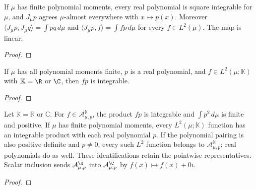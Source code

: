 \begin{supporting}

\begin{theorem}
\label{thm:general-polynomial-L2-basic}
\leanok
If $\mu$ has finite polynomial moments, every real polynomial is square
integrable for $\mu$, and $J_\mu p$ agrees $\mu$-almost everywhere with
$x\mapsto p(x)$. Moreover $\langle J_\mu p,J_\mu q\rangle=\int pq\,d\mu$ and
$\langle J_\mu p,f\rangle=\int fp\,d\mu$ for every $f\in L^2(\mu)$.
The map is linear.
\end{theorem}
\begin{proof}
\leanok
\end{proof}

\begin{theorem}
\label{thm:L2-polynomial-product-integrable}
\leanok
If $\mu$ has all polynomial moments finite, $p$ is a real polynomial, and
$f\in L^2(\mu;\mathbb K)$ with $\mathbb K=\R$ or $\C$, then $fp$ is integrable.
\end{theorem}
\begin{proof}
\leanok
\end{proof}

\begin{theorem}
\label{thm:integral-coefficient-input}
\leanok
Let $\mathbb K=\mathbb R$ or $\mathbb C$.
For $f\in\mathcal A_{\mu,p}^{\mathbb K}$, the product $fp$ is integrable
and $\int p^2\,d\mu$ is finite and positive.
If $\mu$ has finite polynomial moments, every $L^2(\mu;\mathbb K)$ function
has an integrable product with each real polynomial $p$.
If the polynomial pairing is also positive definite and $p\ne0$, every such
$L^2$ function belongs to $\mathcal A_{\mu,p}^{\mathbb K}$; real polynomials
do as well. These identifications retain the pointwise representatives.
Scalar inclusion sends $\mathcal A_{\mu,p}^{\R}$ into
$\mathcal A_{\mu,p}^{\C}$ by $f(x)\mapsto f(x)+0i$.
\end{theorem}
\begin{proof}
\leanok
\end{proof}


\end{supporting}
